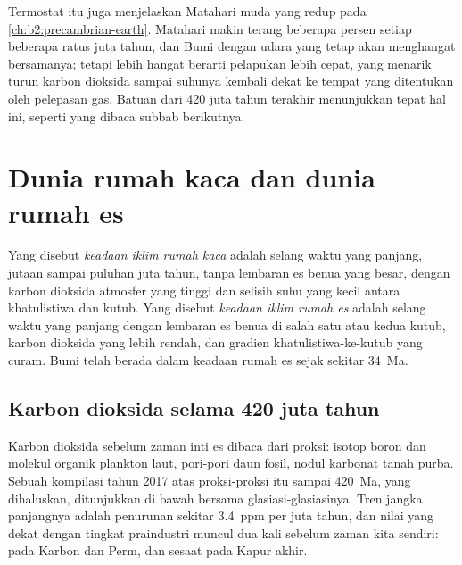 Termostat itu juga menjelaskan Matahari muda yang redup pada \cref{ch:b2:precambrian-earth}. Matahari makin terang
beberapa persen setiap beberapa ratus juta tahun, dan Bumi dengan udara yang tetap akan menghangat bersamanya;
tetapi lebih hangat berarti pelapukan lebih cepat, yang menarik turun karbon dioksida sampai suhunya
kembali dekat ke tempat yang ditentukan oleh pelepasan gas. Batuan dari 420 juta tahun terakhir menunjukkan tepat
hal ini, seperti yang dibaca subbab berikutnya.

\section{Dunia rumah kaca dan dunia rumah es}\label{sec:b2:deep-time-climate:states}

\begin{definition}\label{def:b2:deep-time-climate:states}
Yang disebut \emph{keadaan iklim rumah kaca} adalah selang waktu yang panjang, jutaan sampai
puluhan juta tahun, tanpa lembaran es benua yang besar, dengan karbon dioksida atmosfer yang tinggi
dan selisih suhu yang kecil antara khatulistiwa dan kutub. Yang disebut \emph{keadaan iklim
rumah es} adalah selang waktu yang panjang dengan lembaran es benua di salah satu
atau kedua kutub, karbon dioksida yang lebih rendah, dan gradien khatulistiwa-ke-kutub yang curam. Bumi telah berada dalam
keadaan rumah es sejak sekitar \qty{34}{Ma}.
\end{definition}

\subsection*{Karbon dioksida selama 420 juta tahun}

Karbon dioksida sebelum zaman inti es dibaca dari proksi: isotop boron dan molekul organik
plankton laut, pori-pori daun fosil, nodul karbonat tanah purba. Sebuah kompilasi tahun 2017
atas proksi-proksi itu sampai \qty{420}{Ma}, yang dihaluskan, ditunjukkan di bawah bersama glasiasi-glasiasinya. Tren
jangka panjangnya adalah penurunan sekitar \qty{3.4}{ppm} per juta tahun, dan nilai yang dekat dengan
tingkat praindustri muncul dua kali sebelum zaman kita sendiri: pada Karbon dan Perm, dan
sesaat pada Kapur akhir.

